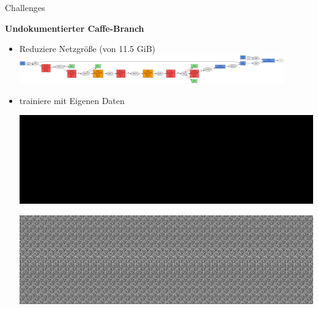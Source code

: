 \begin{frame}{Challenges}

\centering

\textbf{Undokumentierter Caffe-Branch}
\vspace{0.5cm}

\begin{itemize}
 \item Reduziere Netzgröße (von 11.5 GiB) \\
 \includegraphics[width=0.9\textwidth]{../images/mid.png}
 \item trainiere mit Eigenen Daten \\
 \begin{minipage}{0.45\textwidth}
 \includegraphics[width=\textwidth]{../images/out.png}
 \end{minipage}  \begin{minipage}{0.45\textwidth}
 \includegraphics[width=\textwidth]{../images/out-um.png}  
 \end{minipage}
\end{itemize}
\end{frame}